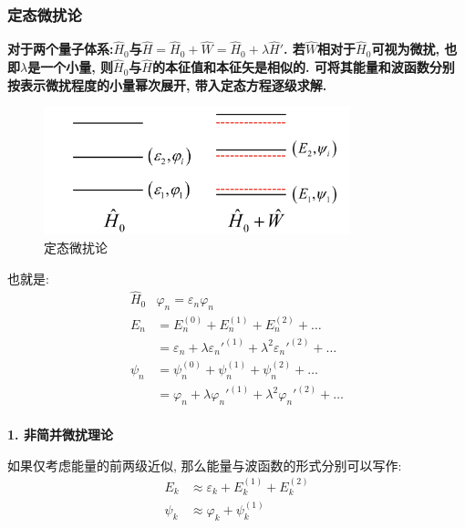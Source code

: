 \documentclass[a4paper, 11pt]{article}
\begin{document}
\begin{spacing}{1.2}
        \subsubsection{定态微扰论}

          \textbf{对于两个量子体系:$\hat{H}_0$与$\hat{H} = \hat{H}_0 + \hat{W}= \hat{H}_0 + \lambda\hat{H}'$. 
          若$\hat{W}$相对于$\hat{H}_0$可视为微扰, 也即$\lambda$是一个小量, 则$\hat{H}_0$与$\hat{H}$的本征值和本征矢是相似的. 
          可将其能量和波函数分别按表示微扰程度的小量幂次展开, 带入定态方程逐级求解.} 

          \begin{figure}[H]
            \centering\includegraphics[width=3.5in]{image/perturbation_theory}
            \caption{定态微扰论}
          \end{figure}

          也就是:
          \begin{equation}
            \begin{aligned}
              \hat{H}_0&\varphi_n = \varepsilon_n\varphi_n \\
              E_n &= E_n^{(0)} + E_n^{(1)} +E_n^{(2)} + \ldots\\
                  &= \varepsilon_n + \lambda\varepsilon_n'^{(1)} + \lambda^2\varepsilon_n'^{(2)}+\ldots\\
              \psi_n &= \psi_n^{(0)} + \psi_n^{(1)} +\psi_n^{(2)} + \ldots\\
                  &= \varphi_n + \lambda\varphi_n'^{(1)} + \lambda^2\varphi_n'^{(2)}+\ldots\\
            \end{aligned}
          \end{equation}

          \textbf{1. 非简并微扰理论}

          如果仅考虑能量的前两级近似, 那么能量与波函数的形式分别可以写作:
          \begin{equation}
            \begin{aligned}
              E_k &\approx \varepsilon_k + E_k^{(1)} + E_k^{(2)}\\
              \psi_k &\approx \varphi_k + \psi_k^{(1)}
            \end{aligned}
          \end{equation}


\end{spacing}
\end{document}
